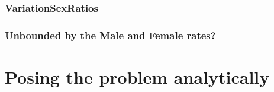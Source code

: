 \subsection{VariationSexRatios}
 
\subsection{Unbounded by the Male and Female rates?}
 
  

  

 
 
 \chapter{Posing the problem analytically}
 \label{chap:Posing}
 
\startappendices


 \label{app:Appendix1}
 
 
 
 
 
 
 \nocite{*} %
\startbibliography
 \begin{singlespace} %
 \end{singlespace}


